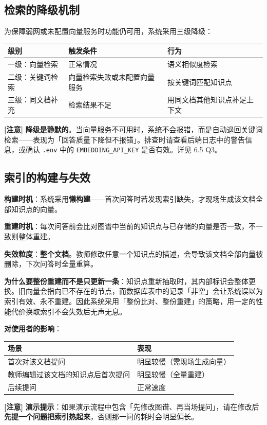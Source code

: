 \documentclass[UTF8,a4paper,11pt]{ctexrep}
\newcommand{\warnmark}{\textcolor{todobar}{\textbf{[注意]}}}
\begin{document}
\subsection{检索的降级机制}

为保障弱网或未配置向量服务时功能仍可用，系统采用三级降级：

\begin{center}
\small
\begin{tabularx}{\linewidth}{@{}XXX@{}}
\toprule
级别 & 触发条件 & 行为 \\
\midrule
一级：向量检索 & 正常情况 & 语义相似度检索 \\
二级：关键词检索 & 向量检索失败或未配置向量服务 & 按关键词匹配知识点 \\
三级：同文档补充 & 检索结果不足 & 用同文档其他知识点补足上下文 \\
\bottomrule
\end{tabularx}
\end{center}
\begin{todobox}
\warnmark{} \textbf{降级是静默的}。当向量服务不可用时，系统不会报错，而是自动退回关键词检索——表现为「回答质量下降但不报错」。排查时请查看后端日志中的警告信息，或确认 \texttt{.env} 中的 \texttt{EMBEDDING\_API\_KEY} 是否有效。详见 6.5 Q3。

\end{todobox}


\subsection{索引的构建与失效}

\textbf{构建时机}：系统采用\textbf{懒构建}——首次问答时若发现索引缺失，才现场生成该文档全部知识点的向量。

\textbf{重建时机}：每次问答前会比对图谱中当前的知识点与已存储的向量是否一致，不一致则整体重建。

\textbf{失效粒度}：\textbf{整个文档}。教师修改任意一个知识点的描述，会导致该文档全部向量被删除，下次问答时全量重算。

\textbf{为什么要整份重建而不是只更新一条}：知识点重新抽取时，其内部标识会整体更换。旧向量会指向已不存在的节点，而数据库表中的记录「非空」会让系统误以为索引有效、永不重建。因此系统采用「整份比对、整份重建」的策略，用一定的性能代价换取索引不会失效后无声无息。

\textbf{对使用者的影响}：

\begin{center}
\small
\begin{tabularx}{\linewidth}{@{}XX@{}}
\toprule
场景 & 表现 \\
\midrule
首次对该文档提问 & 明显较慢（需现场生成向量） \\
教师编辑过该文档的知识点后首次提问 & 明显较慢（全量重建） \\
后续提问 & 正常速度 \\
\bottomrule
\end{tabularx}
\end{center}
\begin{todobox}
\warnmark{} \textbf{演示提示}：如果演示流程中包含「先修改图谱、再当场提问」，请在修改后\textbf{先提一个问题把索引热起来}，否则那一问的耗时会明显偏长。

\end{todobox}
\end{document}
